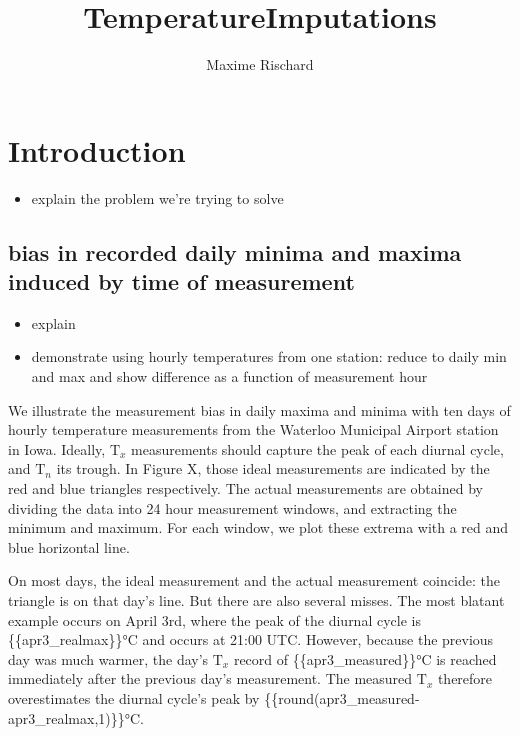 \documentclass[letter]{article}
\title{TemperatureImputations}
\author{Maxime Rischard}
\providecommand{\tightlist}{%
      \setlength{\itemsep}{0pt}\setlength{\parskip}{0pt}}
\newcommand{\Tn}{\mathrm{T}_{n}}
\newcommand{\Tx}{\mathrm{T}_{x}}
\providecommand{\tightlist}{%
  	  \setlength{\itemsep}{0pt}\setlength{\parskip}{0pt}}
\begin{document}
    
    
    
    \maketitle
    
    
	\tableofcontents


    







    	\section{Introduction}\label{introduction}

\begin{itemize}
\tightlist
\item
  explain the problem we're trying to solve
\end{itemize}

\subsection{bias in recorded daily minima and maxima induced by time of
measurement}\label{bias-in-recorded-daily-minima-and-maxima-induced-by-time-of-measurement}

\begin{itemize}
\tightlist
\item
  explain
\item
  demonstrate using hourly temperatures from one station: reduce to
  daily min and max and show difference as a function of measurement
  hour
\end{itemize}
    


    	We illustrate the measurement bias in daily maxima and minima with ten
days of hourly temperature measurements from the Waterloo Municipal
Airport station in Iowa. Ideally, \(\Tx\) measurements should capture
the peak of each diurnal cycle, and \(\Tn\) its trough. In Figure X,
those ideal measurements are indicated by the red and blue triangles
respectively. The actual measurements are obtained by dividing the data
into 24 hour measurement windows, and extracting the minimum and
maximum. For each window, we plot these extrema with a red and blue
horizontal line.

On most days, the ideal measurement and the actual measurement coincide:
the triangle is on that day's line. But there are also several misses.
The most blatant example occurs on April 3rd, where the peak of the
diurnal cycle is \{\{apr3\_realmax\}\}°C and occurs at 21:00 UTC.
However, because the previous day was much warmer, the day's \(\Tx\)
record of \{\{apr3\_measured\}\}°C is reached immediately after the
previous day's measurement. The measured \(\Tx\) therefore overestimates
the diurnal cycle's peak by
\{\{round(apr3\_measured-apr3\_realmax,1)\}\}°C.
    
\end{document}
